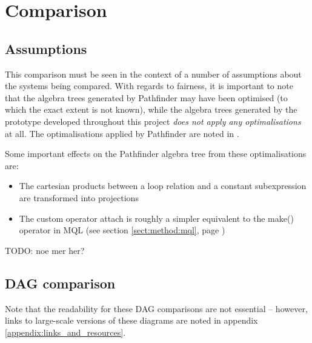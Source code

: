 \section{Comparison}
\label{sect:results:comparison}
\subsection{Assumptions}
This comparison must be seen in the context of a number of assumptions
about the systems being compared. With regards to fairness, it is important to
note that the algebra trees generated by Pathfinder may have been
optimised (to which the exact extent is not known), while the algebra trees
generated by the prototype developed throughout this project \emph{does not apply any optimalisations} at all. The
optimalisations applied by Pathfinder are noted
in \cite{pathfinder_purelyRelational}.

Some important effects on the Pathfinder algebra tree from these
optimalisations are:
\begin{itemize}
  \item The cartesian products between a loop relation and a constant
  subexpression are transformed into projections
  \item The custom operator \textsf{attach} is roughly a simpler equivalent to
  the \textsf{make()} operator in MQL (see section \ref{sect:method:mql}, page
  \pageref{sect:method:mql})
\end{itemize}
TODO: noe mer her?

\newpage
\subsection{DAG comparison}
Note that the readability for these DAG comparisons are not essential --
however, links to large-scale versions of these diagrams are noted in appendix
\ref{appendix:links_and_resources}.

